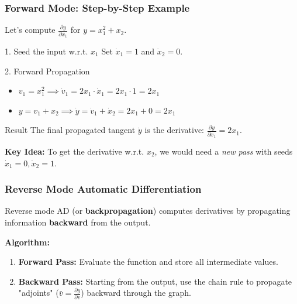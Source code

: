\documentclass{beamer}
\begin{document}
\begin{frame}
	\frametitle{Forward Mode: Step-by-Step Example}
	
	Let's compute $\frac{\partial y}{\partial x_1}$ for $y = x_1^2 + x_2$.
	
	\begin{block}{1. Seed the input w.r.t. $x_1$}
		Set $\dot{x}_1 = 1$ and $\dot{x}_2 = 0$.
	\end{block}
	
	\begin{block}{2. Forward Propagation}
		\begin{itemize}
			\item $v_1 = x_1^2 \implies \dot{v}_1 = 2x_1 \cdot \dot{x}_1 = 2x_1 \cdot 1 = 2x_1$
			\item $y = v_1 + x_2 \implies \dot{y} = \dot{v}_1 + \dot{x}_2 = 2x_1 + 0 = 2x_1$
		\end{itemize}
	\end{block}
	
	\begin{alertblock}{Result}
		The final propagated tangent $\dot{y}$ is the derivative: $\frac{\partial y}{\partial x_1} = 2x_1$.
	\end{alertblock}
	
	\textbf{Key Idea:} To get the derivative w.r.t. $x_2$, we would need a \textit{new pass} with seeds $\dot{x}_1 = 0, \dot{x}_2 = 1$.
	
\end{frame}

\begin{frame}
	\frametitle{Reverse Mode Automatic Differentiation}
	
	Reverse mode AD (or \textbf{backpropagation}) computes derivatives by propagating information \textbf{backward} from the output.
	
	\textbf{Algorithm:}
	\begin{enumerate}
		\item \textbf{Forward Pass:} Evaluate the function and store all intermediate values.
		\item \textbf{Backward Pass:} Starting from the output, use the chain rule to propagate "adjoints" ($\bar{v} = \frac{\partial y}{\partial v}$) backward through the graph.
	\end{enumerate}
	
\end{frame}
\end{document}
